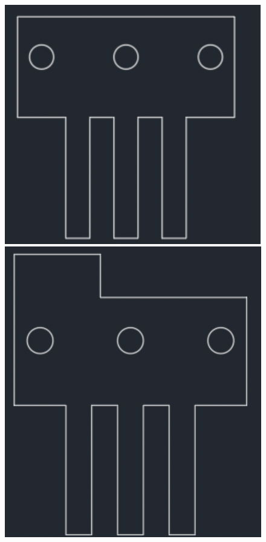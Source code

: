 \documentclass[12pt,a4paper]{article}
\begin{document}
\begin{CJK*}{UTF8}{bkai}
\begin{enumerate}
\begin{figure}[H]
                  \centering
                  \includegraphics[height=0.2\textheight]{./images/stator_draft_1.png}
                  \includegraphics[height=0.2\textheight]{./images/stator_draft_2.png}

\end{figure}
\end{enumerate}
\end{CJK*}
\end{document}
